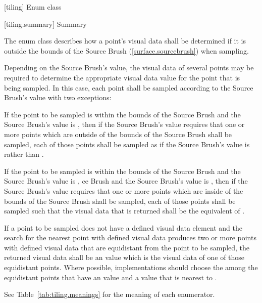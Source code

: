  [tiling] {Enum class }

 [tiling.summary] { Summary}

\pnum
The  enum class describes how a point's visual data shall be 
determined if it is outside the bounds of the Source Brush (\ref{surface.sourcebrush}) when sampling.

\pnum
Depending on the Source Brush's  value, the visual data of several points may be required to determine the appropriate visual data value for the point that is being sampled. In this case, each point shall be sampled according to the Source Brush's  value with two exceptions:
\begin{enumeratea}
\item If the point to be sampled is within the bounds of the Source Brush and the Source Brush's  value is , then if the Source Brush's  value requires that one or more points which are outside of the bounds of the Source Brush shall be sampled, each of those points shall be sampled as if the Source Brush's  value is  rather than .
\item If the point to be sampled is within the bounds of the Source Brush and the Source Brush's  value is , ce Brush and the Source Brush's  value is , then if the Source Brush's  value requires that one or more points which are inside of the bounds of the Source Brush shall be sampled, each of those points shall be sampled such that the visual data that is returned shall be the equivalent of .
\end{enumeratea}

\pnum
If a point to be sampled does not have a defined visual data element and the search for the nearest point with defined visual data produces two or more points with defined visual data that are equidistant from the point to be sampled, the returned visual data shall be an \unspecnorm value which is the visual data of one of those equidistant points. Where possible, implementations should choose the among the equidistant points that have an \xaxis value and a \yaxis value that is nearest to .

\pnum
See Table~\ref{tab:tiling.meanings} for the meaning of each  enumerator.

